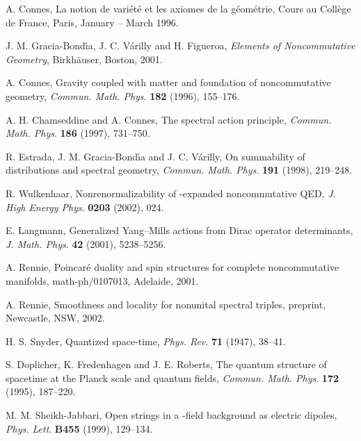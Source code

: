 \documentclass[a4paper,12pt]{article}
\providecommand{\1}{\mathbf{1}}         %
\providecommand{\7}{\dagger}            %
\providecommand{\8}{\bullet}            %
\renewcommand{\.}{\cdot}            %
\renewcommand{\:}{\colon}           %
\begin{document}
\begin{thebibliography}{74}
A. Connes,
La notion de vari\'et\'e et les axiomes de la g\'eom\'etrie,
Cours au Coll\`ege de France,
Paris, January -- March 1996.

J. M. Gracia-Bond\'{\i}a, J. C. V\'arilly and H. Figueroa,
\textit{Elements of Noncommutative Geometry},
Birkh\"auser, Boston, 2001.

A. Connes,
Gravity coupled with matter and foundation of noncommutative
geometry,
\textit{Commun. Math. Phys}. {\bf 182} (1996), 155--176.

A. H. Chamseddine and A. Connes,
The spectral action principle,
\textit{Commun. Math. Phys}. {\bf 186} (1997), 731--750.

R. Estrada, J. M. Gracia-Bond\'{\i}a and J. C. V\'arilly,
On summability of distributions and spectral geometry,
\textit{Commun. Math. Phys}. {\bf 191} (1998), 219--248.

R. Wulkenhaar,
Nonrenormalizability of \myHighlight{$\theta$}\coordHE{}-expanded noncommutative QED,
\textit{J. High Energy Phys}. {\bf 0203} (2002), 024.

E. Langmann,
Generalized Yang--Mills actions from Dirac operator determinants,
\textit{J. Math. Phys}. {\bf 42} (2001), 5238--5256.

A. Rennie,
Poincar\'e duality and spin\coordHE{} structures for complete
noncommutative manifolds,
math-ph/0107013, Adelaide, 2001.

A. Rennie,
Smoothness and locality for nonunital spectral triples,
preprint, Newcastle, NSW, 2002.

H. S. Snyder,
Quantized space-time,
\textit{Phys. Rev}. {\bf 71} (1947), 38--41.

S. Doplicher, K. Fredenhagen and J. E. Roberts,
The quantum structure of spacetime at the Planck scale and quantum
fields,
\textit{Commun. Math. Phys}. {\bf 172} (1995), 187--220.

M. M. Sheikh-Jabbari,
Open strings in a \coordHE{}-field background as electric dipoles,
\textit{Phys. Lett}. {\bf B455} (1999), 129--134.


\end{thebibliography}
\end{document}
